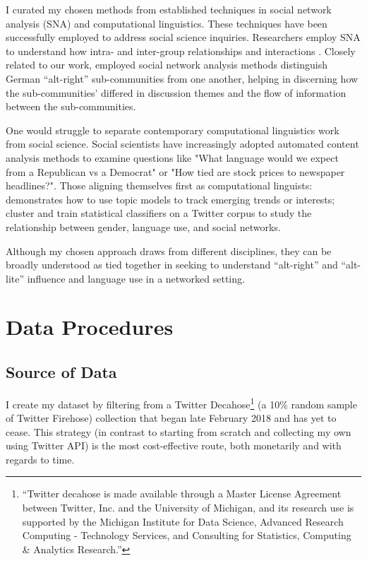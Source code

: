 \documentclass[acmlarge, screen, authorversion]{acmart}
\begin{document}
I curated my chosen methods from established techniques in social network analysis (SNA) and computational linguistics. These techniques have been successfully employed to address social science inquiries.  Researchers employ SNA to understand how intra- and inter-group relationships and interactions \cite{carringtonModelsMethodsSocial2005}. Closely related to our work, \citet{morstatterAltRightAltRechtsTwitter2018} employed social network analysis methods distinguish German ``alt-right'' sub-communities from one another, helping in discerning how the sub-communities' differed in discussion themes and the flow of information between the sub-communities.

One would struggle to separate contemporary computational linguistics work from social science. Social scientists \cite{monroeFightinWordsLexical2008, gentzkowTextData2019} have increasingly adopted automated content analysis methods to examine questions like "What language would we expect from a Republican vs a Democrat" or "How tied are stock prices to newspaper headlines?". Those aligning themselves first as computational linguists: \citep{lauOnlineTrendAnalysis} demonstrates how to use topic models to track emerging trends or interests; \cite{bammanGenderIdentityLexical2014} cluster and train statistical classifiers on a Twitter corpus to study the relationship between gender, language use, and social networks. 

Although my chosen approach draws from different disciplines, they can be broadly understood as tied together in seeking to understand ``alt-right'' and ``alt-lite'' influence and language use in a networked setting.  


\section{Data Procedures}

    \subsection{Source of Data}
    
    I create my dataset by filtering from a Twitter Decahose\footnote{“Twitter decahose is made available through a Master License Agreement between Twitter, Inc. and the University of Michigan, and its research use is supported by the Michigan Institute for Data Science, Advanced Research Computing - Technology Services, and Consulting for Statistics, Computing \& Analytics Research.”} (a 10\% random sample of Twitter Firehose) collection that began late February 2018 and has yet to cease. This strategy (in contrast to starting from scratch and collecting my own using Twitter API) is the most cost-effective route, both monetarily and with regards to time.
\end{document}
